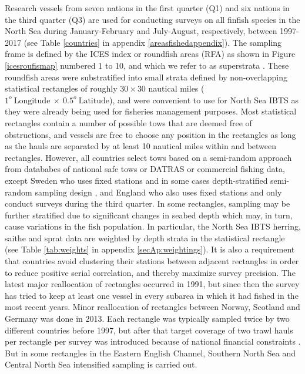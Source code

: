 \documentclass[a4paper 12pt]{article}
\numberwithin{equation}{section}
\begin{document}
\indent Research vessels from seven nations in the first quarter (Q1) and six nations in the third quarter (Q3) are used for conducting surveys on all finfish species in the North Sea during January-February and July-August, respectively, between 1997-2017 (see Table \ref{countries} in appendix \ref{areasfishedappendix}). The sampling frame is defined by the ICES index or roundfish areas (RFA) as shown in Figure \ref{icesroufismap} numbered 1 to 10, and which we refer to as superstrata \citep{nottestad2015quantifying, fuller2011sampling}. These  roundfish areas were substratified into small strata defined by non-overlapping statistical rectangles of roughly $30 \times 30$ nautical miles ($1^{o} \  \mathrm{Longitude} \ \times  \  0.5^{o} \ \mathrm{Latitude}$), and were convenient to use for North Sea IBTS as they were already being used for fisheries management purposes. Most statistical rectangles contain a number of possible tows that are deemed free of obstructions, and vessels are free to choose any position in the rectangles as long as the hauls are separated by at least 10 nautical miles within and between rectangles. However, all countries select tows based on a semi-random approach from datababes of national safe tows or DATRAS or commercial fishing data, except Sweden who uses fixed stations and in some cases depth-stratified semi-random sampling design \citep{ICES2018}, and England who also uses fixed stations and only conduct surveys during the third quarter. In some rectangles, sampling may be further stratified due to significant changes in seabed depth which may, in turn, cause variations in the fish population. In particular, the North Sea IBTS herring, saithe and sprat data are weighted by depth strata in the statistical rectangle (see Table \ref{tab:weights} in appendix \ref{secAp:weightings}). It is also a requirement that countries avoid clustering their stations between adjacent rectangles in order to reduce positive serial correlation, and thereby maximize survey precision.  The latest major reallocation of rectangles occurred in 1991, but since then the survey has tried to keep at least one vessel in every subarea in which it had fished in the most recent years. Minor reallocation of rectangles between Norway, Scotland and Germany was done in 2013. Each rectangle was  typically sampled twice by two different countries before 1997, but after that target coverage of two trawl hauls per rectangle per survey  was introduced because of national financial constraints \citep{ICES2015}. But in some rectangles in the Eastern English Channel, Southern North Sea and Central North Sea intensified sampling is carried out.\\
\end{document}
